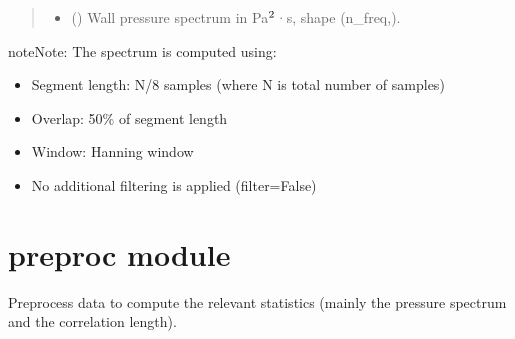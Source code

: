 \documentclass[letterpaper,10pt,english]{sphinxmanual}
\begin{document}
\begin{fulllineitems}
\begin{fulllineitems}
\begin{quote}
\begin{description}
\begin{itemize}
\item {} 
\sphinxAtStartPar
{} () \textendash{} Wall pressure spectrum in Pa\(\sp{\text{2}}\)·s, shape (n\_freq,).

\end{itemize}


\end{description}\end{quote}

\begin{sphinxadmonition}{note}{Note:}
\sphinxAtStartPar
The spectrum is computed using:
\begin{itemize}
\item {} 
\sphinxAtStartPar
Segment length: N/8 samples (where N is total number of samples)

\item {} 
\sphinxAtStartPar
Overlap: 50\% of segment length

\item {} 
\sphinxAtStartPar
Window: Hanning window

\item {} 
\sphinxAtStartPar
No additional filtering is applied (filter=False)

\end{itemize}
\end{sphinxadmonition}

\end{fulllineitems}


\end{fulllineitems}


\sphinxstepscope


\section{preproc module}
\label{\detokenize{preproc:preproc-module}}\label{\detokenize{preproc::doc}}
\sphinxAtStartPar
Pre\sphinxhyphen{}process data to compute the relevant statistics (mainly the pressure spectrum and the correlation length).
\label{\detokenize{preproc:module-amiet_self_noise.preproc}}
\end{document}
